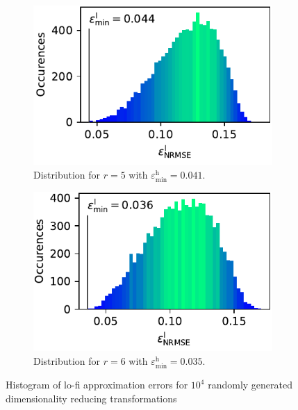 \documentclass[
  a4paper,  %
  twoside,  %
  bibliography=totoc,
  headsepline,
  cleardoublepage=empty,
  parskip=half,
  draft=false
]{scrbook}
\begin{document}
\begin{mdframed}[style=style]
\begin{figure}[H]
\begin{subfigure}{.5\textwidth}
   \includegraphics[width=\linewidth]{graphics/ww_hist_5}
  \caption{Distribution for $r=5$ with $\varepsilon^\mathrm{h}_{\mathrm{min}}=0.041$.}
\vspace{3mm}
\label{fig:ishigami_hist_2}
\end{subfigure}%
\begin{subfigure}{.5\textwidth}
  \centering
   \includegraphics[width=\linewidth]{graphics/ww_hist_6}
  \caption{Distribution for $r=6$ with $\varepsilon^\mathrm{h}_{\mathrm{min}}=0.035$.}
\vspace{3mm}
\label{fig:ishigami_hist_1}
\end{subfigure}
\delimit
\caption{Histogram of lo-fi approximation errors for $10^4$ randomly generated dimensionality reducing transformations}
\label{fig:ww_hist_all}
\end{figure}
\end{mdframed}
\end{document}
